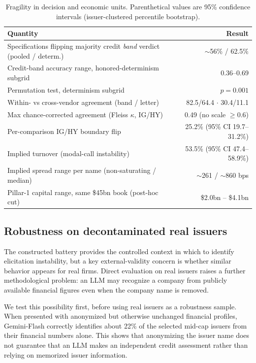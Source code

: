 \documentclass[pdflatex,sn-nature,lineno]{sn-jnl}
\theoremstyle{thmstyleone}
\begin{document}
\begin{table}[t]\centering
\caption{Fragility in decision and economic units. Parenthetical values are 95\% confidence intervals
(issuer-clustered percentile bootstrap).}\label{tab:frag}
\begin{tabular}{lr}\toprule
Quantity & Result \\\midrule
Specifications flipping majority credit \emph{band} verdict (pooled / determ.) & $\sim$56\% / 62.5\% \\
Credit-band accuracy range, honored-determinism subgrid & 0.36--0.69 \\
Permutation test, determinism subgrid & $p=0.001$ \\
Within- vs cross-vendor agreement (band / letter) & 82.5/64.4 $\cdot$ 30.4/11.1 \\
Max chance-corrected agreement (Fleiss $\kappa$, IG/HY) & 0.49 (no scale $\geq0.6$) \\
Per-comparison IG/HY boundary flip & 25.2\% (95\% CI 19.7--31.2\%) \\
Implied turnover (modal-call instability) & 53.5\% (95\% CI 47.4--58.9\%) \\
Implied spread range per name (non-saturating / median) & $\sim$261 / $\sim$860 bps \\
Pillar-1 capital range, same \$45bn book (post-hoc cut) & \$2.0bn -- \$4.1bn \\\bottomrule
\end{tabular}\end{table}

\subsection{Robustness on decontaminated real issuers}
The constructed battery provides the controlled context in which to identify elicitation instability, but
a key external-validity concern is whether similar behavior appears for real firms. Direct evaluation on
real issuers raises a further methodological problem: an LLM may recognize a company from publicly
available financial figures even when the company name is removed.

We test this possibility first, before using real issuers as a robustness sample. When presented with anonymized
but otherwise unchanged financial profiles, Gemini-Flash correctly identifies about 22\% of the selected
mid-cap issuers from their financial numbers alone. This shows that anonymizing the issuer name does not
guarantee that an LLM makes an independent credit assessment rather than relying on memorized issuer
information.
\end{document}
